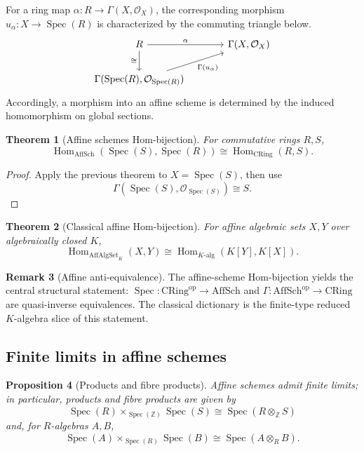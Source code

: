 \documentclass[12pt, a4paper]{article}
\newtheorem{theorem}{Theorem}[section]
\newtheorem{proposition}[theorem]{Proposition}
\theoremstyle{definition}
\newtheorem{remark}[theorem]{Remark}
\DeclareMathOperator{\Spec}{Spec}
\DeclareMathOperator{\Hom}{Hom}
\newcommand{\OO}{\mathcal{O}}
\newcommand{\AffAlgSetK}{\mathrm{AffAlgSet}_K}
\newcommand{\AffSch}{\mathrm{AffSch}}
\newcommand{\CRing}{\mathrm{CRing}}
\begin{document}
For a ring map $\alpha:R\to\Gamma(X,\OO_X)$, the corresponding morphism $u_\alpha:X\to\Spec(R)$ is characterized by the commuting triangle below.
\[
\begin{tikzcd}[column sep=large]
R \arrow[r, "\alpha"] \arrow[d, "\cong"'] & \Gamma(X,\OO_X) \\
\Gamma(\Spec(R),\OO_{\Spec(R)}) \arrow[ur, "\Gamma(u_\alpha)"'] &
\end{tikzcd}
\]
Accordingly, a morphism into an affine scheme is determined by the induced homomorphism on global sections.

\begin{theorem}[Affine schemes Hom-bijection]
For commutative rings $R,S$,
\[
\boxed{\Hom_{\AffSch}(\Spec(S),\Spec(R))\cong \Hom_{\CRing}(R,S).}
\]
\end{theorem}

\begin{proof}
Apply the previous theorem to $X=\Spec(S)$, then use
\[
\Gamma(\Spec(S),\OO_{\Spec(S)})\cong S.
\]
\end{proof}

\begin{theorem}[Classical affine Hom-bijection]
For affine algebraic sets $X,Y$ over algebraically closed $K$,
\[
\boxed{\Hom_{\AffAlgSetK}(X,Y)\cong \Hom_{K\text{-alg}}(K[Y],K[X]).}
\]
\end{theorem}

\begin{remark}[Affine anti-equivalence]
The affine-scheme Hom-bijection yields the central structural statement:
$\Spec: \CRing^{\mathrm{op}}\to \AffSch$ and
$\Gamma: \AffSch^{\mathrm{op}}\to \CRing$ are quasi-inverse equivalences. The classical dictionary is the finite-type reduced $K$-algebra slice of this statement.
\end{remark}

\subsection{Finite limits in affine schemes}

\begin{proposition}[Products and fibre products]
Affine schemes admit finite limits; in particular, products and fibre products are given by
\[
\boxed{\Spec(R)\times_{\Spec(\mathbb Z)}\Spec(S)\cong \Spec(R\otimes_{\mathbb Z}S)}
\]
and, for $R$-algebras $A,B$,
\[
\boxed{\Spec(A)\times_{\Spec(R)}\Spec(B)\cong \Spec(A\otimes_R B).}
\]
\end{proposition}
\end{document}
